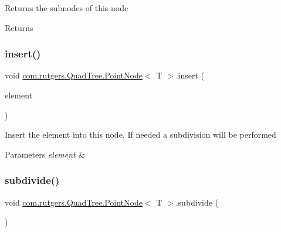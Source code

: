Returns the subnodes of this node

\begin{DoxyReturn}{Returns}

\end{DoxyReturn}
\mbox{\label{classcom_1_1rutgers_1_1QuadTree_1_1PointNode_a8b9eceb7216cbb98a251c6fbc3d42d4b}} 
\subsubsection{\texorpdfstring{insert()}{insert()}}
{\footnotesize\ttfamily void \hyperlink{classcom_1_1rutgers_1_1QuadTree_1_1PointNode}{com.\+rutgers.\+Quad\+Tree.\+Point\+Node}$<$ T $>$.insert (\begin{DoxyParamCaption}\item[{\hyperlink{classcom_1_1rutgers_1_1QuadTree_1_1PointNodeElement}{Point\+Node\+Element}$<$ T $>$}]{element }\end{DoxyParamCaption})}

Insert the element into this node. If needed a subdivision will be performed


\begin{DoxyParams}{Parameters}
{\em element} & \\
\hline
\end{DoxyParams}
\mbox{\label{classcom_1_1rutgers_1_1QuadTree_1_1PointNode_a0177d4d297bf8a6fdeac5b014f1205df}} 
\subsubsection{\texorpdfstring{subdivide()}{subdivide()}}
{\footnotesize\ttfamily void \hyperlink{classcom_1_1rutgers_1_1QuadTree_1_1PointNode}{com.\+rutgers.\+Quad\+Tree.\+Point\+Node}$<$ T $>$.subdivide (\begin{DoxyParamCaption}{ }\end{DoxyParamCaption})}


